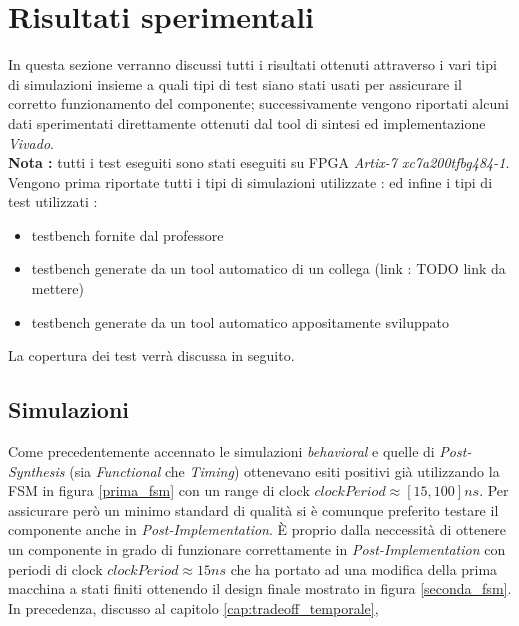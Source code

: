 \documentclass[11pt,a4paper]{article}
\begin{document}
    \section{Risultati sperimentali}
        In questa sezione verranno discussi tutti i risultati ottenuti attraverso i vari tipi di simulazioni insieme a quali tipi di test siano stati usati per assicurare il corretto funzionamento del componente; successivamente vengono riportati alcuni dati sperimentati direttamente ottenuti dal tool di sintesi ed implementazione \textit{Vivado}.\\
        \textbf{Nota :} tutti i test eseguiti sono stati eseguiti su FPGA \textit{Artix-7 xc7a200tfbg484-1}.
        Vengono prima riportate tutti i tipi di simulazioni utilizzate :
        ed infine i tipi di test utilizzati :
        \begin{itemize}
            \item testbench fornite dal professore 
            \item testbench generate da un tool automatico di un collega (link : TODO link da mettere)
            \item testbench generate da un tool automatico appositamente sviluppato
        \end{itemize}
        La copertura dei test verrà discussa in seguito.
        \subsection{Simulazioni}
            Come precedentemente accennato le simulazioni \textit{behavioral} e quelle di \textit{Post-Synthesis} (sia \textit{Functional} che \textit{Timing}) ottenevano esiti positivi già utilizzando la FSM in figura \ref{prima_fsm} con un range di clock $clockPeriod \approx [15,100] ns$.
            Per assicurare però un minimo standard di qualità si è comunque preferito testare il componente anche in \textit{Post-Implementation}.
            È proprio dalla neccessità di ottenere un componente in grado di funzionare correttamente in  \textit{Post-Implementation} con periodi di clock $clockPeriod \approx 15 ns$ che ha portato ad una modifica della prima macchina a stati finiti ottenendo il design finale mostrato in figura \ref{seconda_fsm}.
            In precedenza, discusso al capitolo \ref{cap:tradeoff_temporale}, 
\end{document}
